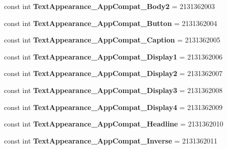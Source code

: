 \begin{DoxyCompactItemize}
\item 
\mbox{\label{classXaria_1_1Resource_1_1Style_a0affd1df87fec06a7091fd61f98b5436}} 
const int {\bfseries Text\+Appearance\+\_\+\+App\+Compat\+\_\+\+Body2} = 2131362003
\item 
\mbox{\label{classXaria_1_1Resource_1_1Style_a1100f32966ba221fe9f88fbd1eaa5860}} 
const int {\bfseries Text\+Appearance\+\_\+\+App\+Compat\+\_\+\+Button} = 2131362004
\item 
\mbox{\label{classXaria_1_1Resource_1_1Style_aff1ca73420a3425c245a76e111edbd85}} 
const int {\bfseries Text\+Appearance\+\_\+\+App\+Compat\+\_\+\+Caption} = 2131362005
\item 
\mbox{\label{classXaria_1_1Resource_1_1Style_ab4aaa21b1a6230b1bc980018cb428249}} 
const int {\bfseries Text\+Appearance\+\_\+\+App\+Compat\+\_\+\+Display1} = 2131362006
\item 
\mbox{\label{classXaria_1_1Resource_1_1Style_ade7de2bb9a94b02b4e2d7a57c1899f3b}} 
const int {\bfseries Text\+Appearance\+\_\+\+App\+Compat\+\_\+\+Display2} = 2131362007
\item 
\mbox{\label{classXaria_1_1Resource_1_1Style_a3d2bee4434c0f0bb3d6400b7da6e0058}} 
const int {\bfseries Text\+Appearance\+\_\+\+App\+Compat\+\_\+\+Display3} = 2131362008
\item 
\mbox{\label{classXaria_1_1Resource_1_1Style_a9601700520dcc039b3e666a729d983c5}} 
const int {\bfseries Text\+Appearance\+\_\+\+App\+Compat\+\_\+\+Display4} = 2131362009
\item 
\mbox{\label{classXaria_1_1Resource_1_1Style_abf92e9905f1f070bfbdb8aa5a5b265c1}} 
const int {\bfseries Text\+Appearance\+\_\+\+App\+Compat\+\_\+\+Headline} = 2131362010
\item 
\mbox{\label{classXaria_1_1Resource_1_1Style_a439f16a4aa5be451e09528132c154f28}} 
const int {\bfseries Text\+Appearance\+\_\+\+App\+Compat\+\_\+\+Inverse} = 2131362011

\end{DoxyCompactItemize}
